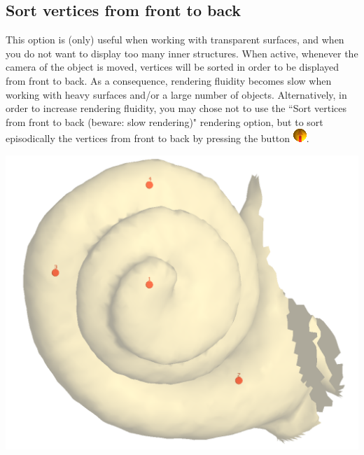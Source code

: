 \noindent
\begin{minipage}{0.55\textwidth}

\subsection{Sort vertices from front to back}
This option is (only) useful when working with transparent surfaces, and when you do not want to display too many inner structures. When active, whenever the camera of the object is moved, vertices will be sorted in order to be displayed from front to back. As a consequence, rendering fluidity becomes slow when working with heavy surfaces and/or a large number of objects. Alternatively, in order to increase rendering fluidity, you may chose not to use the ``Sort vertices from front to back (beware: slow rendering)" rendering option, but to sort
episodically the vertices from front to back by pressing the button \includegraphics[scale=0.7]{images/pixmap/Sort_vertices02.png}.

\end{minipage}  
 \begin{minipage}{0.45\textwidth}\centering

\includegraphics[scale=0.1]{images/Viewing_options/Sort_front_back.png}

 \end{minipage} 
\noindent

